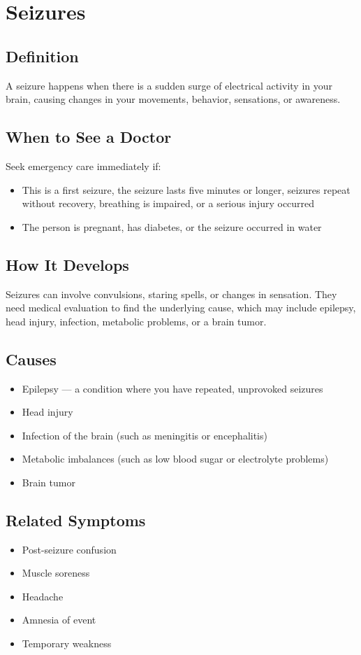 \chapter{Seizures}

\section*{Definition}
A seizure happens when there is a sudden surge of electrical activity in your brain, causing changes in your movements, behavior, sensations, or awareness.

\section*{When to See a Doctor}
Seek emergency care immediately if:
\begin{itemize}
  \item This is a first seizure, the seizure lasts five minutes or longer, seizures repeat without recovery, breathing is impaired, or a serious injury occurred
  \item The person is pregnant, has diabetes, or the seizure occurred in water
\end{itemize}

\section*{How It Develops}
Seizures can involve convulsions, staring spells, or changes in sensation. They need medical evaluation to find the underlying cause, which may include epilepsy, head injury, infection, metabolic problems, or a brain tumor.

\section*{Causes}
\begin{itemize}
  \item Epilepsy — a condition where you have repeated, unprovoked seizures
  \item Head injury
  \item Infection of the brain (such as meningitis or encephalitis)
  \item Metabolic imbalances (such as low blood sugar or electrolyte problems)
  \item Brain tumor
\end{itemize}

\section*{Related Symptoms}
\begin{itemize}
  \item Post-seizure confusion
  \item Muscle soreness
  \item Headache
  \item Amnesia of event
  \item Temporary weakness
\end{itemize}

